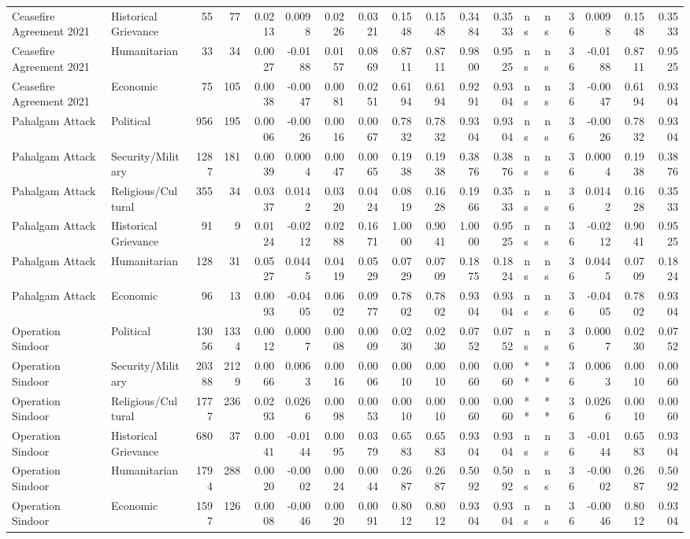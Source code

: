 \begin{longtable}{llrrrrrrrrrrllrrrr}
Ceasefire Agreement 2021 & Historical Grievance & 55 & 77 & 0.0213 & 0.0098 & 0.0226 & 0.0321 & 0.1548 & 0.1548 & 0.3484 & 0.3533 & ns & ns & 36 & 0.0098 & 0.1548 & 0.3533 \\
Ceasefire Agreement 2021 & Humanitarian & 33 & 34 & 0.0027 & -0.0188 & 0.0157 & 0.0869 & 0.8711 & 0.8711 & 0.9800 & 0.9525 & ns & ns & 36 & -0.0188 & 0.8711 & 0.9525 \\
Ceasefire Agreement 2021 & Economic & 75 & 105 & 0.0038 & -0.0047 & 0.0081 & 0.0251 & 0.6194 & 0.6194 & 0.9291 & 0.9304 & ns & ns & 36 & -0.0047 & 0.6194 & 0.9304 \\
Pahalgam Attack & Political & 956 & 195 & 0.0006 & -0.0026 & 0.0016 & 0.0067 & 0.7832 & 0.7832 & 0.9304 & 0.9304 & ns & ns & 36 & -0.0026 & 0.7832 & 0.9304 \\
Pahalgam Attack & Security/Military & 1287 & 181 & 0.0039 & 0.0004 & 0.0047 & 0.0065 & 0.1938 & 0.1938 & 0.3876 & 0.3876 & ns & ns & 36 & 0.0004 & 0.1938 & 0.3876 \\
Pahalgam Attack & Religious/Cultural & 355 & 34 & 0.0337 & 0.0142 & 0.0320 & 0.0424 & 0.0819 & 0.1628 & 0.1966 & 0.3533 & ns & ns & 36 & 0.0142 & 0.1628 & 0.3533 \\
Pahalgam Attack & Historical Grievance & 91 & 9 & 0.0124 & -0.0212 & 0.0288 & 0.1671 & 1.0000 & 0.9041 & 1.0000 & 0.9525 & ns & ns & 36 & -0.0212 & 0.9041 & 0.9525 \\
Pahalgam Attack & Humanitarian & 128 & 31 & 0.0527 & 0.0445 & 0.0419 & 0.0529 & 0.0729 & 0.0709 & 0.1875 & 0.1824 & ns & ns & 36 & 0.0445 & 0.0709 & 0.1824 \\
Pahalgam Attack & Economic & 96 & 13 & 0.0093 & -0.0405 & 0.0602 & 0.0977 & 0.7802 & 0.7802 & 0.9304 & 0.9304 & ns & ns & 36 & -0.0405 & 0.7802 & 0.9304 \\
Operation Sindoor & Political & 13056 & 1334 & 0.0012 & 0.0007 & 0.0008 & 0.0009 & 0.0230 & 0.0230 & 0.0752 & 0.0752 & ns & ns & 36 & 0.0007 & 0.0230 & 0.0752 \\
Operation Sindoor & Security/Military & 20388 & 2129 & 0.0066 & 0.0063 & 0.0016 & 0.0006 & 0.0010 & 0.0010 & 0.0060 & 0.0060 & ** & ** & 36 & 0.0063 & 0.0010 & 0.0060 \\
Operation Sindoor & Religious/Cultural & 1777 & 236 & 0.0293 & 0.0266 & 0.0098 & 0.0053 & 0.0010 & 0.0010 & 0.0060 & 0.0060 & ** & ** & 36 & 0.0266 & 0.0010 & 0.0060 \\
Operation Sindoor & Historical Grievance & 680 & 37 & 0.0041 & -0.0144 & 0.0095 & 0.0379 & 0.6583 & 0.6583 & 0.9304 & 0.9304 & ns & ns & 36 & -0.0144 & 0.6583 & 0.9304 \\
Operation Sindoor & Humanitarian & 1794 & 288 & 0.0020 & -0.0002 & 0.0024 & 0.0044 & 0.2687 & 0.2687 & 0.5092 & 0.5092 & ns & ns & 36 & -0.0002 & 0.2687 & 0.5092 \\
Operation Sindoor & Economic & 1597 & 126 & 0.0008 & -0.0046 & 0.0020 & 0.0091 & 0.8012 & 0.8012 & 0.9304 & 0.9304 & ns & ns & 36 & -0.0046 & 0.8012 & 0.9304 \\
\end{longtable}
